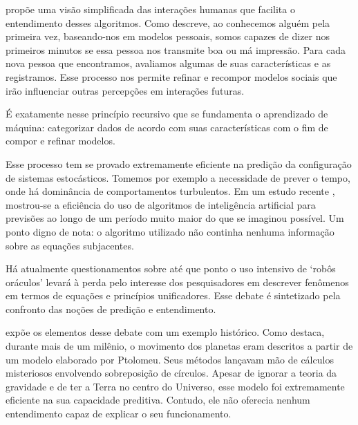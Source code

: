  propõe uma visão simplificada das interações humanas que facilita o entendimento desses algoritmos. Como descreve, ao conhecemos alguém pela primeira vez, baseando-nos em modelos pessoais, somos capazes de dizer nos primeiros minutos se essa pessoa nos transmite boa ou má impressão. Para cada nova pessoa que encontramos, avaliamos algumas de suas características e as registramos. Esse processo nos permite refinar e recompor modelos sociais que irão influenciar outras percepções em interações futuras. 

É exatamente nesse princípio recursivo que se fundamenta o aprendizado de máquina: categorizar dados de acordo com suas características com o fim de compor e refinar modelos.

Esse processo tem se provado extremamente eficiente na predição da configuração de sistemas estocásticos. Tomemos por exemplo a necessidade de prever o tempo, onde há dominância de comportamentos turbulentos. Em um estudo recente , mostrou-se a eficiência do uso de algoritmos de inteligência artificial para previsões ao longo de um período muito maior do que se imaginou possível. Um ponto digno de nota: o algoritmo utilizado não continha nenhuma informação sobre as equações subjacentes. 

Há atualmente questionamentos sobre até que ponto o uso intensivo de `robôs oráculos' levará à perda pelo interesse dos pesquisadores em descrever fenômenos em termos de equações e princípios unificadores. Esse debate é sintetizado pela confronto das noções de predição e entendimento.

 expõe os elementos desse debate com um exemplo histórico. Como destaca, durante mais de um milênio, o movimento dos planetas eram descritos a partir de um modelo elaborado por Ptolomeu. Seus métodos lançavam mão de cálculos misteriosos envolvendo sobreposição de círculos. Apesar de ignorar a teoria da gravidade e de ter a Terra no centro do Universo, esse modelo foi extremamente eficiente na sua capacidade preditiva. Contudo, ele não oferecia nenhum entendimento capaz de explicar o seu funcionamento.

